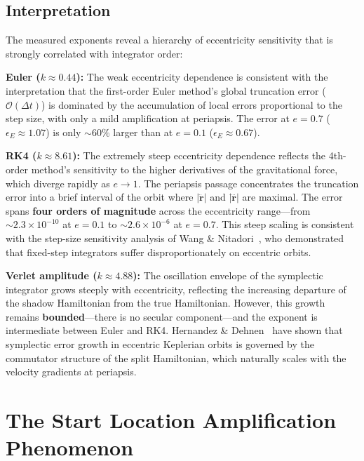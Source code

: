 \documentclass[twocolumn, 10pt]{article}
\begin{document}
\subsection{Interpretation}

The measured exponents reveal a hierarchy of eccentricity sensitivity that is strongly correlated with integrator order:

\textbf{Euler ($k \approx 0.44$):} The weak eccentricity dependence is consistent with the interpretation that the first-order Euler method's global truncation error ($\mathcal{O}(\Delta t)$) is dominated by the accumulation of local errors proportional to the step size, with only a mild amplification at periapsis. The error at $e = 0.7$ ($\epsilon_E \approx 1.07$) is only ${\sim}60\%$ larger than at $e = 0.1$ ($\epsilon_E \approx 0.67$).

\textbf{RK4 ($k \approx 8.61$):} The extremely steep eccentricity dependence reflects the 4th-order method's sensitivity to the higher derivatives of the gravitational force, which diverge rapidly as $e \to 1$. The periapsis passage concentrates the truncation error into a brief interval of the orbit where $|\dddot{\mathbf{r}}|$ and $|\ddddot{\mathbf{r}}|$ are maximal. The error spans \textbf{four orders of magnitude} across the eccentricity range---from $\sim 2.3 \times 10^{-10}$ at $e = 0.1$ to $\sim 2.6 \times 10^{-6}$ at $e = 0.7$. This steep scaling is consistent with the step-size sensitivity analysis of Wang \& Nitadori~\cite{wang2020}, who demonstrated that fixed-step integrators suffer disproportionately on eccentric orbits.

\textbf{Verlet amplitude ($k \approx 4.88$):} The oscillation envelope of the symplectic integrator grows steeply with eccentricity, reflecting the increasing departure of the shadow Hamiltonian from the true Hamiltonian. However, this growth remains \textbf{bounded}---there is no secular component---and the exponent is intermediate between Euler and RK4. Hernandez \& Dehnen~\cite{hernandez2016} have shown that symplectic error growth in eccentric Keplerian orbits is governed by the commutator structure of the split Hamiltonian, which naturally scales with the velocity gradients at periapsis.

\section{The Start Location Amplification Phenomenon}
\label{sec:start_location}
\end{document}
